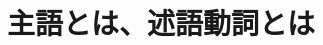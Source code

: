 \documentclass[aspectratio=169,xcolor={dvipsnames,table}]{beamer}
\begin{document}



\section{主語とは、述語動詞とは}
\end{document}
